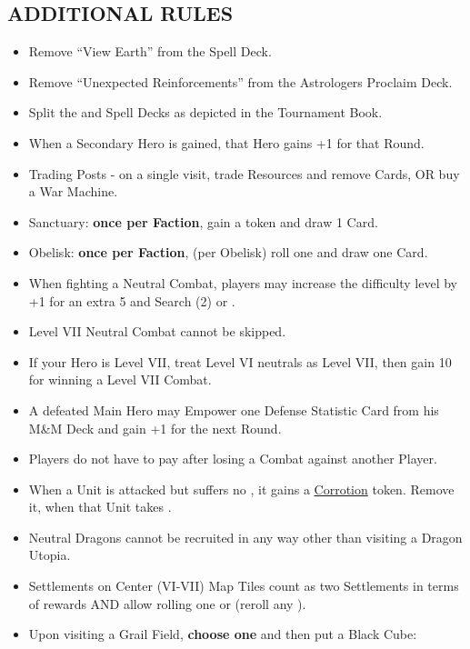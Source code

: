 \begin{multicols*}{2}
\subsection*{\MakeUppercase{Additional Rules}}
\begin{itemize}
  \item Remove ``View Earth'' from the Spell Deck.
  \item Remove ``Unexpected Reinforcements'' from the Astrologers Proclaim Deck.
  \item Split the  and Spell Decks as depicted in the Tournament Book.
  \item When a Secondary Hero is gained, that Hero gains +1  for that Round.
  \item Trading Posts - on a single visit, trade Resources and remove Cards, OR buy a War Machine.
  \item Sanctuary: \textbf{once per Faction}, gain a  token and draw 1 Card.
  \item Obelisk: \textbf{once per Faction}, (per Obelisk) roll one  and draw one Card.
  \item When fighting a Neutral Combat, players may increase the difficulty level by +1 for an extra 5  and Search (2)  or . %
  \item Level VII Neutral Combat cannot be skipped.
  \item If your Hero is Level VII, treat Level VI neutrals as Level VII, then gain 10  for winning a Level VII Combat.
  \item A defeated Main Hero may Empower one Defense Statistic Card from his M\&M Deck and gain +1  for the next Round.
  \item Players do not have to pay  after losing a Combat against another Player.
  \item When a Unit is attacked but suffers no , it gains a \href{https://archon-studio.com/files/manuals/homm/HoMM-Stronghold-Mission-Book-Beta_EN.pdf}{Corrotion} token. Remove it, when that Unit takes .
  \item Neutral Dragons cannot be recruited in any way other than visiting a Dragon Utopia.
  \item Settlements on Center (VI-VII) Map Tiles count as two Settlements in terms of rewards AND allow rolling one  or  (reroll any ).
  \item Upon visiting a Grail Field, \textbf{choose one} and then put a Black Cube:

\end{itemize}
\end{multicols*}
